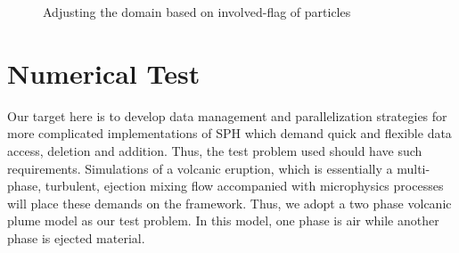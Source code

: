 \documentclass[conference,compsoc]{IEEEtran}
\begin{document}
\begin{figure}[!t]
\centering
{}
\label{fig:Involved_initial}
\hfil
{}
\label{fig:Involved_domain_adjusting}
\caption{ Adjusting the domain based on involved-flag of particles}
\label{fig:Domain_adjusting}
\end{figure}
\section{Numerical Test}
Our target here is to develop data management and parallelization strategies for more complicated implementations of SPH which demand quick and flexible data access, deletion and addition. Thus, the test problem used should have such requirements. Simulations of a volcanic eruption, which is essentially a multi-phase, turbulent, ejection mixing flow accompanied with microphysics processes will place these demands on the framework. Thus, we adopt a two phase volcanic plume model\cite{suzuki2005numerical} as our test problem. In this model, one phase is air while another phase is ejected material.
\end{document}
